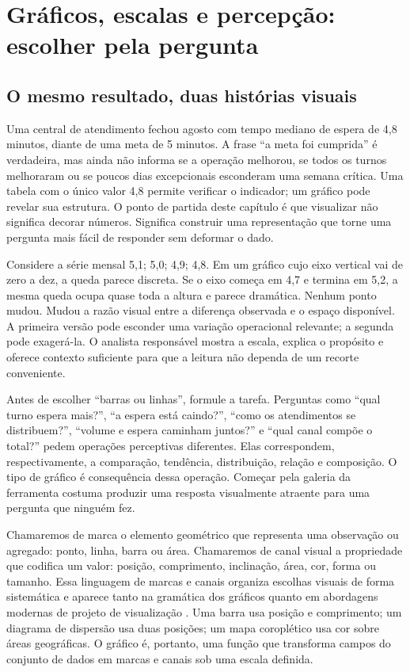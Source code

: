 \graphicspath{{capitulos/capitulo_06/figuras/}{figuras/}{./figuras/}}

\chapter[Gráficos, escalas e percepção]{Gráficos, escalas e percepção: escolher pela pergunta}

\section{O mesmo resultado, duas histórias visuais}

Uma central de atendimento fechou agosto com tempo mediano de espera de 4,8 minutos, diante de uma meta de 5 minutos. A frase ``a meta foi cumprida'' é verdadeira, mas ainda não informa se a operação melhorou, se todos os turnos melhoraram ou se poucos dias excepcionais esconderam uma semana crítica. Uma tabela com o único valor 4,8 permite verificar o indicador; um gráfico pode revelar sua estrutura. O ponto de partida deste capítulo é que visualizar não significa decorar números. Significa construir uma representação que torne uma pergunta mais fácil de responder sem deformar o dado.

Considere a série mensal 5,1; 5,0; 4,9; 4,8. Em um gráfico cujo eixo vertical vai de zero a dez, a queda parece discreta. Se o eixo começa em 4,7 e termina em 5,2, a mesma queda ocupa quase toda a altura e parece dramática. Nenhum ponto mudou. Mudou a razão visual entre a diferença observada e o espaço disponível. A primeira versão pode esconder uma variação operacional relevante; a segunda pode exagerá-la. O analista responsável mostra a escala, explica o propósito e oferece contexto suficiente para que a leitura não dependa de um recorte conveniente.

Antes de escolher ``barras ou linhas'', formule a tarefa. Perguntas como ``qual turno espera mais?'', ``a espera está caindo?'', ``como os atendimentos se distribuem?'', ``volume e espera caminham juntos?'' e ``qual canal compõe o total?'' pedem operações perceptivas diferentes. Elas correspondem, respectivamente, a comparação, tendência, distribuição, relação e composição. O tipo de gráfico é consequência dessa operação. Começar pela galeria da ferramenta costuma produzir uma resposta visualmente atraente para uma pergunta que ninguém fez.

Chamaremos de marca o elemento geométrico que representa uma observação ou agregado: ponto, linha, barra ou área. Chamaremos de canal visual a propriedade que codifica um valor: posição, comprimento, inclinação, área, cor, forma ou tamanho. Essa linguagem de marcas e canais organiza escolhas visuais de forma sistemática e aparece tanto na gramática dos gráficos quanto em abordagens modernas de projeto de visualização \cite{wilkinson2005,munzner2014}. Uma barra usa posição e comprimento; um diagrama de dispersão usa duas posições; um mapa coroplético usa cor sobre áreas geográficas. O gráfico é, portanto, uma função que transforma campos do conjunto de dados em marcas e canais sob uma escala definida.

